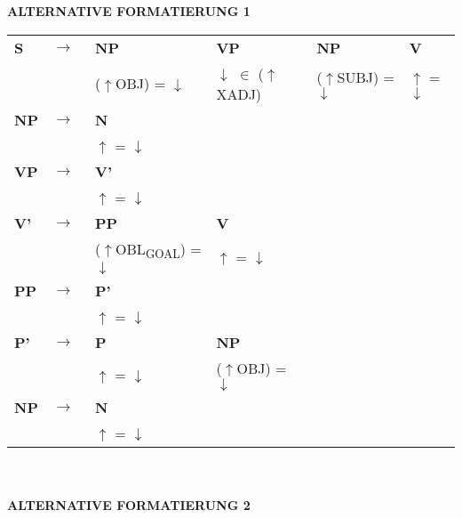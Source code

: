 \documentclass[12pt,a4paper]{article}
\begin{document}
\newpage
\textbf{ALTERNATIVE FORMATIERUNG 1}\\
\begin{tabular}{ l  l  l  l  l  l }
  \textbf{S} & $\rightarrow$ & \: \: \textbf{NP} & \: \: \textbf{VP} & \: \: \textbf{NP} & \: \textbf{V}\\
   & $\qquad$ & ($\uparrow$OBJ) = $\downarrow$ & $\downarrow$ $\in$ ($\uparrow$XADJ) & ($\uparrow$SUBJ) = $\downarrow$ & $\uparrow$ = $\downarrow$ \\
    \textbf{NP} & $\rightarrow$ & \: \textbf{N} \\
   & $\qquad$ & $\uparrow$ = $\downarrow$\\
    \textbf{VP} & $\rightarrow$ & \: \textbf{V'} \\
   & $\qquad$ & $\uparrow$ = $\downarrow$\\
    \textbf{V'} & $\rightarrow$ & \: \: \textbf{PP} & \: \: \: \textbf{V} & \\
   & $\qquad$ &($\uparrow$OBL\textsubscript{GOAL}) = $\downarrow$  & \: $\uparrow$ = $\downarrow$\\
    \textbf{PP} & $\rightarrow$ & \: \: \textbf{P'} \\
	& $\qquad$   & $\uparrow$ = $\downarrow$\\
    \textbf{P'} & $\rightarrow$ & \: \: \textbf{P} & \: \: \textbf{NP} \\
   & $\qquad$ & $\uparrow$ = $\downarrow$ & ($\uparrow$OBJ) = $\downarrow$ \\
    \textbf{NP} & $\rightarrow$ & \: \textbf{N} \\
   & $\qquad$ & $\uparrow$ = $\downarrow$\\
\end{tabular}
\newline
\\
\\
\textbf{ALTERNATIVE FORMATIERUNG 2}\\ \\
\end{document}
